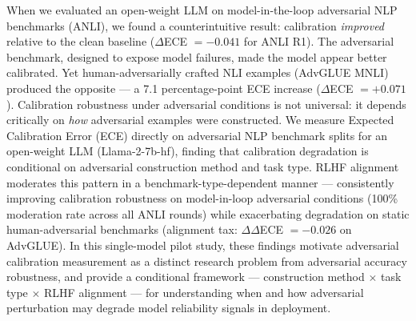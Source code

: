 When we evaluated an open-weight LLM on model-in-the-loop adversarial NLP benchmarks (ANLI), we found a counterintuitive result: calibration \textit{improved} relative to the clean baseline ($\Delta$ECE $= -0.041$ for ANLI R1). The adversarial benchmark, designed to expose model failures, made the model appear better calibrated. Yet human-adversarially crafted NLI examples (AdvGLUE MNLI) produced the opposite --- a 7.1 percentage-point ECE increase ($\Delta$ECE $= +0.071$). Calibration robustness under adversarial conditions is not universal: it depends critically on \textit{how} adversarial examples were constructed. We measure Expected Calibration Error (ECE) directly on adversarial NLP benchmark splits for an open-weight LLM (Llama-2-7b-hf), finding that calibration degradation is conditional on adversarial construction method and task type. RLHF alignment moderates this pattern in a benchmark-type-dependent manner --- consistently improving calibration robustness on model-in-loop adversarial conditions (100\% moderation rate across all ANLI rounds) while exacerbating degradation on static human-adversarial benchmarks (alignment tax: $\Delta\Delta$ECE $= -0.026$ on AdvGLUE). In this single-model pilot study, these findings motivate adversarial calibration measurement as a distinct research problem from adversarial accuracy robustness, and provide a conditional framework --- construction method $\times$ task type $\times$ RLHF alignment --- for understanding when and how adversarial perturbation may degrade model reliability signals in deployment.
